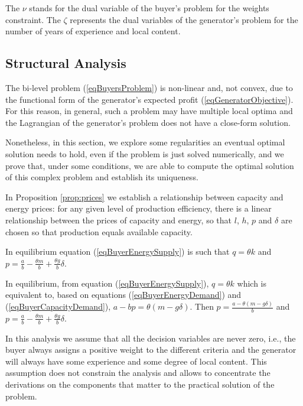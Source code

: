 \documentclass[informs]{informs3}
\begin{document}
The $\nu$ stands for the dual variable of the buyer's problem for the weights constraint. The $\zeta$ represents the dual variables of the generator's problem for the number of years of experience and local content. 


\subsection{Structural Analysis}\label{Section_analytics}

The bi-level problem (\ref{eqBuyersProblem}) is non-linear and, not convex, due to the functional form of the generator's expected profit (\ref{eqGeneratorObjective}). For this reason, in general, such a problem may have multiple local optima and the Lagrangian of the generator's problem does not have a close-form solution. 

Nonetheless, in this section, we explore some regularities an eventual optimal solution needs to hold, even if the problem is just solved numerically, and we prove that, under some conditions, we are able to compute the optimal solution of this complex problem and establish its uniqueness. 

In  Proposition \ref{prop:prices} we establish a relationship between capacity and energy prices: for any given level of production efficiency, there is a linear relationship between the prices of capacity and energy, so that $l$, $h$, $p$ and $\delta$ are chosen so that production equals available capacity. 

\begin{proposition}\label{prop:prices}
In equilibrium equation (\ref{eqBuyerEnergySupply}) is such that $q = \theta k$  and $p =\frac{a}{b}-\frac{\theta m}{b}+\frac{\theta g }{b}\delta$.
\end{proposition}
%
 In equilibrium, from equation (\ref{eqBuyerEnergySupply}), $q = \theta k$ which is equivalent to, based on equations (\ref{eqBuyerEnergyDemand}) and (\ref{eqBuyerCapacityDemand}),  $a - bp = \theta(m -g \delta)$. Then $p =\frac{a -  \theta(m -g \delta)}{b}$ and 
$p =\frac{a}{b}-\frac{\theta m}{b}+\frac{\theta g }{b}\delta$. 
\Halmos
\endproof

In this analysis we assume that all the decision variables are never zero, i.e., the buyer always assigns a positive weight to the different criteria and the generator will always have some experience and some degree of local content. This assumption does not constrain the analysis and allows to concentrate the derivations on the components that matter to the practical solution of the problem.
\end{document}
